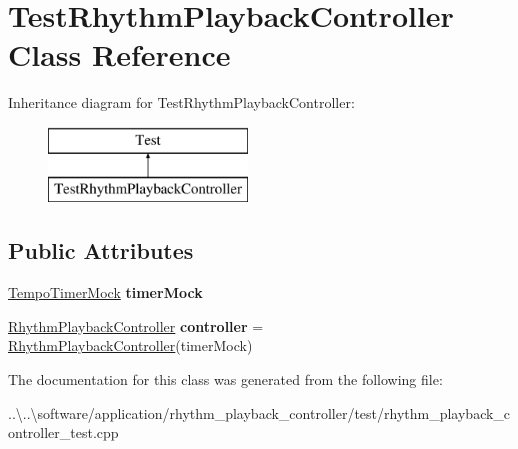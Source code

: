 \hypertarget{class_test_rhythm_playback_controller}{}\section{Test\+Rhythm\+Playback\+Controller Class Reference}
\label{class_test_rhythm_playback_controller}
Inheritance diagram for Test\+Rhythm\+Playback\+Controller\+:\begin{figure}[H]
\begin{center}
\leavevmode
\includegraphics[height=2.000000cm]{class_test_rhythm_playback_controller}
\end{center}
\end{figure}
\subsection*{Public Attributes}
\begin{DoxyCompactItemize}
\item 
\mbox{\label{class_test_rhythm_playback_controller_abe8f6c5c945fc43aa1c4feb96ba30f64}} 
\mbox{\hyperlink{class_tempo_timer_mock}{Tempo\+Timer\+Mock}} {\bfseries timer\+Mock}
\item 
\mbox{\label{class_test_rhythm_playback_controller_a2dbfa579ee33a84cead39a167cdc28e2}} 
\mbox{\hyperlink{class_rhythm_playback_controller}{Rhythm\+Playback\+Controller}} {\bfseries controller} = \mbox{\hyperlink{class_rhythm_playback_controller}{Rhythm\+Playback\+Controller}}(timer\+Mock)
\end{DoxyCompactItemize}


The documentation for this class was generated from the following file\+:\begin{DoxyCompactItemize}
\item 
..\textbackslash{}..\textbackslash{}software/application/rhythm\+\_\+playback\+\_\+controller/test/rhythm\+\_\+playback\+\_\+controller\+\_\+test.\+cpp\end{DoxyCompactItemize}
